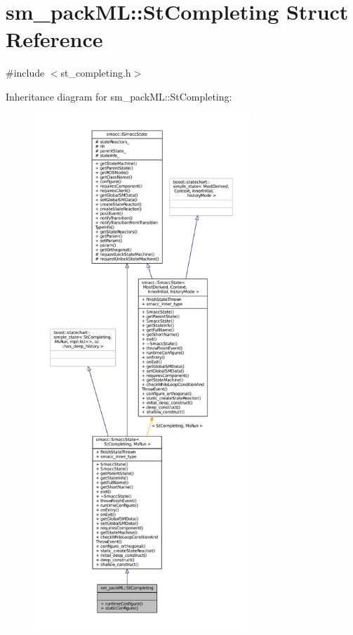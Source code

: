 \hypertarget{structsm__packML_1_1StCompleting}{}\section{sm\+\_\+pack\+ML\+:\+:St\+Completing Struct Reference}
\label{structsm__packML_1_1StCompleting}


{\ttfamily \#include $<$st\+\_\+completing.\+h$>$}



Inheritance diagram for sm\+\_\+pack\+ML\+:\+:St\+Completing\+:
\nopagebreak
\begin{figure}[H]
\begin{center}
\leavevmode
\includegraphics[height=550pt]{structsm__packML_1_1StCompleting__inherit__graph}
\end{center}
\end{figure}


